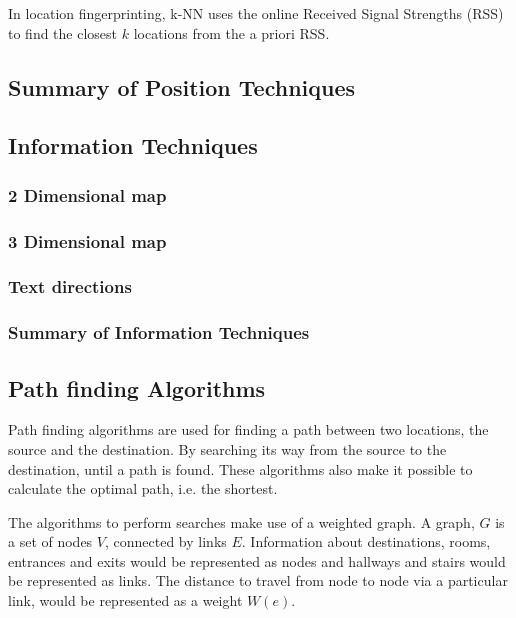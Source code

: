   In location fingerprinting, k-NN uses the online Received Signal Strengths (RSS) to find the closest $k$ locations from the a priori RSS.


  \subsection{Summary of Position Techniques}

  \subsection{Information Techniques}

  \subsubsection{2 Dimensional map}

  \subsubsection{3 Dimensional map}

  \subsubsection{Text directions}

  \subsubsection{Summary of Information Techniques}

\newpage

\subsection{Path finding Algorithms}

  Path finding algorithms are used for finding a path between two locations, the source and the destination. By searching its way from the source to the destination, until a path is found. These algorithms also make it possible to calculate the optimal path, i.e. the shortest.

  The algorithms to perform searches make use of a weighted graph. A graph, $G$ is a set of nodes $V$, connected by links $E$.
  Information about destinations, rooms, entrances and exits would be represented as nodes and hallways and stairs would be represented as links. The distance to travel from node to node via a particular link, would be represented as a weight $W(e)$.

